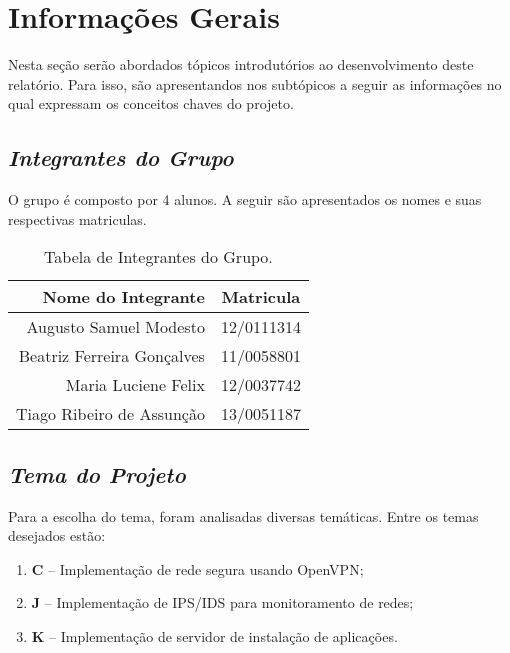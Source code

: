 \chapter[Informações Gerais]{Informações Gerais}
\label{chap:informacoesGerais}
	
	Nesta seção serão abordados tópicos introdutórios ao desenvolvimento deste relatório. Para isso, são apresentandos nos subtópicos a seguir as informações no qual expressam os conceitos chaves do projeto.

	\section[Integrantes do Grupo]{\emph{Integrantes do Grupo}}
	\label{sec:informacoesGerais_integrantes}

		O grupo é composto por 4 alunos. A seguir são apresentados os nomes e suas respectivas matriculas.

		\label{subsubsec:informacoesGerais_integrantes_tables}
		\begin{table}[h]
			\centering 
			\begin{tabular}{r|c}

				Nome do Integrante & Matricula \\
				
				\hline

				Augusto Samuel Modesto & 12/0111314 \\
				Beatriz Ferreira Gonçalves  & 11/0058801 \\
				Maria Luciene Felix & 12/0037742 \\
				Tiago Ribeiro de Assunção & 13/0051187 \\
				
			\end{tabular}
			\caption[Tabela de Integrantes do Grupo]{Tabela de Integrantes do Grupo.}
			\label{tab:informacoesGerais_integrantes_.tables}
		\end{table}

	\section[Tema do Projeto]{\emph{Tema do Projeto}}
	\label{sec:informacoesGerais_tema}

		Para a escolha do tema, foram analisadas diversas temáticas. Entre os temas desejados estão:

		\begin{enumerate}
			\item{\textbf{C} – Implementação de rede segura usando OpenVPN;}
			\item{\textbf{J} – Implementação de IPS/IDS para monitoramento de redes;}
			\item{\textbf{K} – Implementação de servidor de instalação de aplicações.}
		\end{enumerate}


